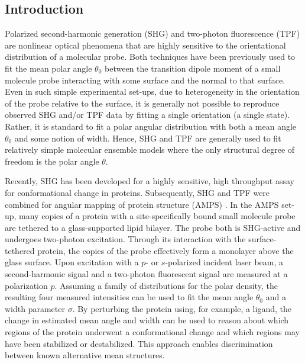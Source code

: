\documentclass[../../main.tex]{subfiles}
\begin{document}
\begin{refsection}
	\section{Introduction}


	Polarized second-harmonic generation (SHG) and two-photon fluorescence (TPF) are nonlinear optical phenomena that are highly sensitive to the orientational distribution of a molecular probe.
	Both techniques have been previously used to fit the mean polar angle $\theta_0$ between the transition dipole moment of a small molecule probe interacting with some surface and the normal to that surface\supercite{heinzDeterminationMolecularOrientation1983,simpsonSHGMagicAngle1999,simpsonMolecularOrientationAngular2000,yamaguchiPhysisorptionGivesNarrower2010,raoMolecularOrientationalDistribution2011,reeveProbingOrientationalDistribution2012,chenTheoryTwophotonInduced1993}.
	Even in such simple experimental set-ups, due to heterogeneity in the orientation of the probe relative to the surface, it is generally not possible to reproduce observed SHG and/or TPF data by fitting a single orientation (\ie a single state).
	Rather, it is standard to fit a polar angular distribution with both a mean angle $\theta_0$ and some notion of width.
	Hence, SHG and TPF are generally used to fit relatively simple molecular ensemble models where the only structural degree of freedom is the polar angle $\theta$.

	Recently, SHG has been developed for a highly sensitive, high throughput assay for conformational change in proteins\supercite{moreeProteinConformationalChanges2015}.
	Subsequently, SHG and TPF were combined for angular mapping of protein structure (AMPS) \supercite{clancyAngularMappingProtein2019}.
	In the AMPS set-up, many copies of a protein with a site-specifically bound small molecule probe are tethered to a glass-supported lipid bilayer.
	The probe both is SHG-active and undergoes two-photon excitation.
	Through its interaction with the surface-tethered protein, the copies of the probe effectively form a monolayer above the glass surface.
	Upon excitation with a $p$- or $s$-polarized incident laser beam, a second-harmonic signal and a two-photon fluorescent signal are measured at a polarization $p$.
	Assuming a family of distributions for the polar density, the resulting four measured intensities can be used to fit the mean angle $\theta_0$ and a width parameter $\sigma$.
	By perturbing the protein using, for example, a ligand, the change in estimated mean angle and width can be used to reason about which regions of the protein underwent a conformational change and which regions may have been stabilized or destabilized.
	This approach enables discrimination between known alternative mean structures.


\end{refsection}
\end{document}
